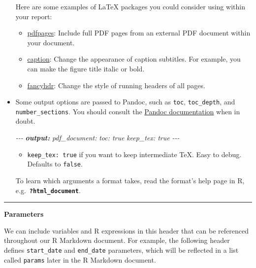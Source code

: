\documentclass[
]{book}
\newenvironment{Shaded}{\begin{snugshade}}{\end{snugshade}}
\newcommand{\AnnotationTok}[1]{\textcolor[rgb]{0.56,0.35,0.01}{\textbf{\textit{#1}}}}
\newcommand{\CommentTok}[1]{\textcolor[rgb]{0.56,0.35,0.01}{\textit{#1}}}
\providecommand{\tightlist}{%
  \setlength{\itemsep}{0pt}\setlength{\parskip}{0pt}}
\theoremstyle{definition}
\theoremstyle{definition}
\theoremstyle{definition}
\theoremstyle{definition}
\theoremstyle{remark}
\begin{document}
\begin{itemize}
  Here are some examples of LaTeX packages you could consider using within your report:

  \begin{itemize}
  \tightlist
  \item
    \href{https://ctan.org/pkg/pdfpages}{pdfpages}: Include full PDF pages from an external PDF document within your document.
  \item
    \href{https://ctan.org/pkg/caption}{caption}: Change the appearance of caption subtitles. For example, you can make the figure title italic or bold.
  \item
    \href{https://ctan.org/pkg/fancyhdr}{fancyhdr}: Change the style of running headers of all pages.
  \end{itemize}
\item
  Some output options are passed to Pandoc, such as \texttt{toc}, \texttt{toc\_depth}, and \texttt{number\_sections}. You should consult the \href{https://pandoc.org/MANUAL.html\#variables}{Pandoc documentation} when in doubt.

\begin{Shaded}
\begin{Highlighting}[]
\CommentTok{{-}{-}{-}}
\AnnotationTok{output:}
\CommentTok{  pdf\_document:}
\CommentTok{    toc: true}
\CommentTok{    keep\_tex: true}
\CommentTok{{-}{-}{-}}
\end{Highlighting}
\end{Shaded}

  \begin{itemize}
  \tightlist
  \item
    \texttt{keep\_tex:\ true} if you want to keep intermediate TeX. Easy to debug. Defaults to \texttt{false}.
  \end{itemize}

  To learn which arguments a format takes, read the format's help page in R, e.g.~{\textbf{\texttt{?html\_document}}}.
\end{itemize}

\begin{center}\rule{0.5\linewidth}{0.5pt}\end{center}

\textbf{Parameters}

We can include variables and R expressions in this header that can be referenced throughout our R Markdown document. For example, the following header defines \texttt{start\_date} and \texttt{end\_date} parameters, which will be reflected in a list called \texttt{params} later in the R Markdown document.
\end{document}

